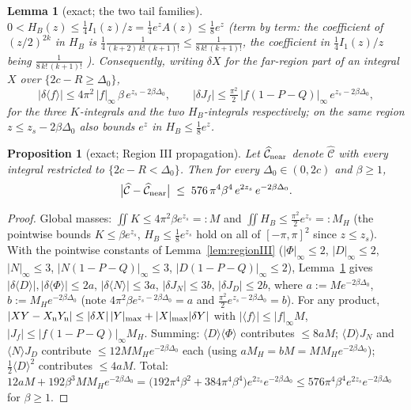 \documentclass[11pt]{article}
\newtheorem{lemma}[theorem]{Lemma}
\newtheorem{proposition}[theorem]{Proposition}
\theoremstyle{remark}
\begin{document}
\begin{lemma}[exact; the two tail families]\label{lem:tails}
$0<H_B(z)\le\tfrac14 I_1(z)/z=\tfrac14e^zA(z)\le\tfrac18e^z$
\textup{(}term by term: the coefficient of $(z/2)^{2k}$ in $H_B$ is
$\tfrac14\frac1{(k+2)\,k!\,(k+1)!}\le\frac1{8\,k!\,(k+1)!}$, the
coefficient in $\tfrac14I_1(z)/z$ being $\frac1{8\,k!\,(k+1)!}$%
\textup{)}. Consequently, writing $\delta X$ for the far-region part
of an integral $X$ over $\{2c-R\ge\Delta_0\}$,
\[
|\delta\langle f\rangle|\le4\pi^2\,|f|_\infty\,\beta\,
e^{z_s-2\beta\Delta_0},
\qquad
|\delta J_f|\le\tfrac{\pi^2}{2}\,|f(1-P-Q)|_\infty\,
e^{z_s-2\beta\Delta_0},
\]
for the three $K$-integrals and the two $H_B$-integrals
respectively; on the same region $z\le z_s-2\beta\Delta_0$ also
bounds $e^z$ in $H_B\le\tfrac18e^z$.
\end{lemma}

\begin{proposition}[exact; Region III propagation]\label{prop:regIII}
Let $\widehat{\mathcal C}_{\rm near}$ denote $\widehat{\mathcal C}$
with every integral restricted to $\{2c-R<\Delta_0\}$. Then for every
$\Delta_0\in(0,2c)$ and $\beta\ge1$,
\[
\bigl|\widehat{\mathcal C}-\widehat{\mathcal C}_{\rm near}\bigr|
\;\le\;576\,\pi^4\beta^4\,e^{2z_s}\,e^{-2\beta\Delta_0}.
\]
\end{proposition}

\begin{proof}
Global masses: $\iint K\le4\pi^2\beta e^{z_s}=:M$ and
$\iint H_B\le\tfrac{\pi^2}{2}e^{z_s}=:M_H$ (the pointwise bounds
$K\le\beta e^{z_s}$, $H_B\le\tfrac18e^{z_s}$ hold on all of
$[-\pi,\pi]^2$ since $z\le z_s$). With the pointwise constants of
Lemma~\ref{lem:regionIII} ($|\Phi|_\infty\le2$, $|D|_\infty\le2$,
$|N|_\infty\le3$, $|N(1-P-Q)|_\infty\le3$,
$|D(1-P-Q)|_\infty\le2$), Lemma~\ref{lem:tails} gives
$|\delta\langle D\rangle|,|\delta\langle\Phi\rangle|\le2a$,
$|\delta\langle N\rangle|\le3a$, $|\delta J_N|\le3b$,
$|\delta J_D|\le2b$, where $a:=Me^{-2\beta\Delta_0}$,
$b:=M_He^{-2\beta\Delta_0}$
\textup{(}note $4\pi^2\beta e^{z_s-2\beta\Delta_0}=a$ and
$\tfrac{\pi^2}2e^{z_s-2\beta\Delta_0}=b$\textup{)}. For any product,
$|XY-X_{\rm n}Y_{\rm n}|\le|\delta X|\,|Y|_{\max}
+|X|_{\max}|\delta Y|$ with $|\langle f\rangle|\le|f|_\infty M$,
$|J_f|\le|f(1-P-Q)|_\infty M_H$. Summing:
$\langle D\rangle\langle\Phi\rangle$ contributes $\le8aM$;
$\langle D\rangle J_N$ and $\langle N\rangle J_D$ contribute
$\le12MM_He^{-2\beta\Delta_0}$ each \textup{(}using
$aM_H=bM=MM_He^{-2\beta\Delta_0}$\textup{)};
$\tfrac12\langle D\rangle^2$ contributes $\le4aM$. Total:
$12aM+192\beta^3MM_He^{-2\beta\Delta_0}
=\bigl(192\pi^4\beta^2+384\pi^4\beta^4\bigr)
e^{2z_s}e^{-2\beta\Delta_0}
\le576\pi^4\beta^4e^{2z_s}e^{-2\beta\Delta_0}$ for $\beta\ge1$.
\end{proof}
\end{document}
